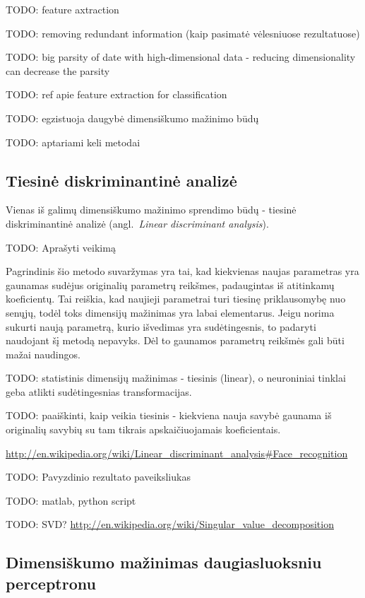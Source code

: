 \documentclass{VUMIFPSbakalaurinis}
\newcommand{\TODO}[1]{
\colorbox{todo-background-color}{TODO: #1}
}
\begin{document}
\TODO{feature axtraction}

\TODO{removing redundant information (kaip pasimatė vėlesniuose rezultatuose)}

\TODO{big parsity of date with high-dimensional data - reducing dimensionality can decrease the parsity}

\TODO{ref apie feature extraction for classification}

\TODO{egzistuoja daugybė dimensiškumo mažinimo būdų}

\TODO{aptariami keli metodai}



\subsection{Tiesinė diskriminantinė analizė}

Vienas iš galimų dimensiškumo mažinimo sprendimo būdų - tiesinė diskriminantinė analizė (angl.~\textit{Linear discriminant analysis}).

\TODO{Aprašyti veikimą}

Pagrindinis šio metodo suvaržymas yra tai, kad kiekvienas naujas parametras yra gaunamas sudėjus originalių parametrų reikšmes, padaugintas iš atitinkamų koeficientų.
Tai reiškia, kad naujieji parametrai turi tiesinę priklausomybę nuo senųjų, todėl toks dimensijų mažinimas yra labai elementarus.
Jeigu norima sukurti naują parametrą, kurio išvedimas yra sudėtingesnis, to padaryti naudojant šį metodą nepavyks.
Dėl to gaunamos parametrų reikšmės gali būti mažai naudingos.

\TODO{statistinis dimensijų mažinimas - tiesinis (linear), o neuroniniai tinklai geba atlikti sudėtingesnias transformacijas.}

\TODO{paaiškinti, kaip veikia tiesinis - kiekviena nauja savybė gaunama iš originalių savybių su tam tikrais apskaičiuojamais koeficientais.}


\url{http://en.wikipedia.org/wiki/Linear_discriminant_analysis#Face_recognition}

\TODO{Pavyzdinio rezultato paveiksliukas}

\TODO{matlab, python script}


\TODO{SVD? \url{http://en.wikipedia.org/wiki/Singular_value_decomposition}}


\subsection{Dimensiškumo mažinimas daugiasluoksniu perceptronu} \label{dimensionality-reduction-perceptron}
\end{document}
